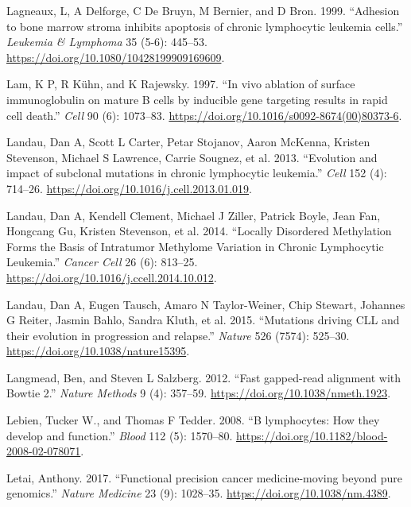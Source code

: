 \documentclass[11pt, a4paper, twosided]{book}
\newenvironment{CSLReferences}%
  {}%
  {\par}
\begin{document}
\begin{CSLReferences}{1}{0}
\leavevmode{}%
Lagneaux, L, A Delforge, C De Bruyn, M Bernier, and D Bron. 1999. {``{Adhesion to bone marrow stroma inhibits apoptosis of chronic lymphocytic leukemia cells.}''} \emph{Leukemia \& Lymphoma} 35 (5-6): 445--53. \url{https://doi.org/10.1080/10428199909169609}.

\leavevmode{}%
Lam, K P, R Kühn, and K Rajewsky. 1997. {``{In vivo ablation of surface immunoglobulin on mature B cells by inducible gene targeting results in rapid cell death.}''} \emph{Cell} 90 (6): 1073--83. \url{https://doi.org/10.1016/s0092-8674(00)80373-6}.

\leavevmode{}%
Landau, Dan A, Scott L Carter, Petar Stojanov, Aaron McKenna, Kristen Stevenson, Michael S Lawrence, Carrie Sougnez, et al. 2013. {``{Evolution and impact of subclonal mutations in chronic lymphocytic leukemia.}''} \emph{Cell} 152 (4): 714--26. \url{https://doi.org/10.1016/j.cell.2013.01.019}.

\leavevmode{}%
Landau, Dan A, Kendell Clement, Michael J Ziller, Patrick Boyle, Jean Fan, Hongcang Gu, Kristen Stevenson, et al. 2014. {``{Locally Disordered Methylation Forms the Basis of Intratumor Methylome Variation in Chronic Lymphocytic Leukemia}.''} \emph{Cancer Cell} 26 (6): 813--25. \url{https://doi.org/10.1016/j.ccell.2014.10.012}.

\leavevmode{}%
Landau, Dan A, Eugen Tausch, Amaro N Taylor-Weiner, Chip Stewart, Johannes G Reiter, Jasmin Bahlo, Sandra Kluth, et al. 2015. {``{Mutations driving CLL and their evolution in progression and relapse}.''} \emph{Nature} 526 (7574): 525--30. \url{https://doi.org/10.1038/nature15395}.

\leavevmode{}%
Langmead, Ben, and Steven L Salzberg. 2012. {``{Fast gapped-read alignment with Bowtie 2}.''} \emph{Nature Methods} 9 (4): 357--59. \url{https://doi.org/10.1038/nmeth.1923}.

\leavevmode{}%
Lebien, Tucker W., and Thomas F Tedder. 2008. {``{B lymphocytes: How they develop and function}.''} \emph{Blood} 112 (5): 1570--80. \url{https://doi.org/10.1182/blood-2008-02-078071}.

\leavevmode{}%
Letai, Anthony. 2017. {``{Functional precision cancer medicine-moving beyond pure genomics.}''} \emph{Nature Medicine} 23 (9): 1028--35. \url{https://doi.org/10.1038/nm.4389}.


\end{CSLReferences}
\end{document}
